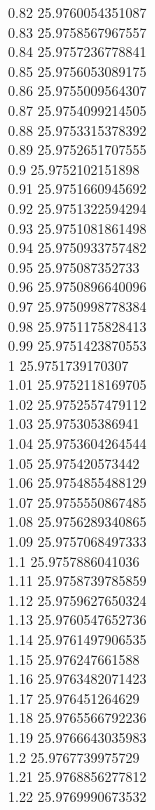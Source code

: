 {0.82	25.9760054351087\\
0.83	25.9758567967557\\
0.84	25.9757236778841\\
0.85	25.9756053089175\\
0.86	25.9755009564307\\
0.87	25.9754099214505\\
0.88	25.9753315378392\\
0.89	25.9752651707555\\
0.9	25.9752102151898\\
0.91	25.9751660945692\\
0.92	25.9751322594294\\
0.93	25.9751081861498\\
0.94	25.9750933757482\\
0.95	25.975087352733\\
0.96	25.9750896640096\\
0.97	25.9750998778384\\
0.98	25.9751175828413\\
0.99	25.9751423870553\\
1	25.9751739170307\\
1.01	25.9752118169705\\
1.02	25.9752557479112\\
1.03	25.975305386941\\
1.04	25.9753604264544\\
1.05	25.975420573442\\
1.06	25.9754855488129\\
1.07	25.9755550867485\\
1.08	25.9756289340865\\
1.09	25.9757068497333\\
1.1	25.9757886041036\\
1.11	25.9758739785859\\
1.12	25.9759627650324\\
1.13	25.9760547652736\\
1.14	25.9761497906535\\
1.15	25.976247661588\\
1.16	25.9763482071423\\
1.17	25.976451264629\\
1.18	25.9765566792236\\
1.19	25.9766643035983\\
1.2	25.9767739975729\\
1.21	25.9768856277812\\
1.22	25.9769990673532\\
}
